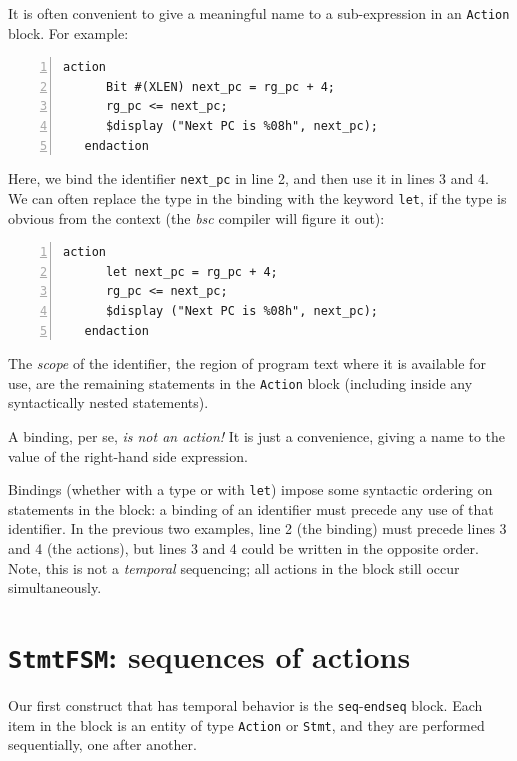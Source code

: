 
It is often convenient to give a meaningful name to a sub-expression
in an {\tt Action} block.  For example:

{\footnotesize
\begin{Verbatim}[frame=single, numbers=left]
   action
      Bit #(XLEN) next_pc = rg_pc + 4;
      rg_pc <= next_pc;
      $display ("Next PC is %08h", next_pc);
   endaction
\end{Verbatim}
}

Here, we bind the identifier \verb|next_pc| in line 2, and then use it
in lines 3 and 4.  We can often replace the type in the binding with
the keyword {\tt let}, if the type is obvious from the context (the
\emph{bsc} compiler will figure it out):

{\footnotesize
\begin{Verbatim}[frame=single, numbers=left]
   action
      let next_pc = rg_pc + 4;
      rg_pc <= next_pc;
      $display ("Next PC is %08h", next_pc);
   endaction
\end{Verbatim}
}

The \emph{scope} of the identifier, {\ie} the region of program text
where it is available for use, are the remaining statements in the
{\tt Action} block (including inside any syntactically nested
statements).

A binding, per se, \emph{is not an action!}  It is just a convenience,
giving a name to the value of the right-hand side expression.

Bindings (whether with a type or with \verb|let|) impose some
syntactic ordering on statements in the block: a binding of an
identifier must precede any use of that identifier.  In the previous
two examples, line 2 (the binding) must precede lines 3 and 4 (the
actions), but lines 3 and 4 could be written in the opposite order.
Note, this is not a \emph{temporal} sequencing; all actions in the
block still occur simultaneously.


\section{{\tt StmtFSM}: sequences of actions}


Our first construct that has temporal behavior is the
\verb|seq|-\verb|endseq| block.  Each item in the block is an entity
of type \verb|Action| or \verb|Stmt|, and they are performed
sequentially, one after another.

